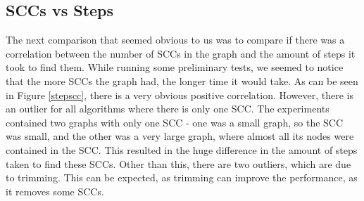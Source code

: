 \documentclass[../master/master.tex]{subfiles}
\begin{document}
\subsection{SCCs vs Steps}
The next comparison that seemed obvious to us was to compare if there was a correlation between the number of SCCs in the graph and the amount of steps it took to find them. While running some preliminary tests, we seemed to notice that the more SCCs the graph had, the longer time it would take. As can be seen in Figure \ref{stepscc}, there is a very obvious positive correlation. However, there is an outlier for all algorithms where there is only one SCC. The experiments contained two graphs with only one SCC - one was a small graph, so the SCC was small, and the other was a very large graph, where almost all its nodes were contained in the SCC. This resulted in the huge difference in the amount of steps taken to find these SCCs. Other than this, there are two outliers, which are due to trimming. This can be expected, as trimming can improve the performance, as it removes some SCCs.
\end{document}
